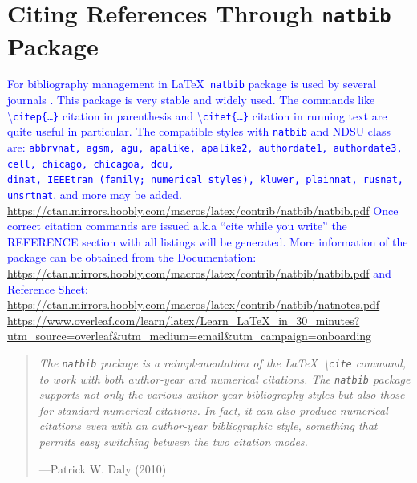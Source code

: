 \documentclass[phd]{ndsu-thesis-2022}
\newcommand\italk[1]{\textcolor{blue}{#1}}  %
\newcommand\cmd[1]{\textbackslash\texttt{#1}}  %
\begin{document}

\section{Citing References Through \texttt{natbib} Package}
\italk{For bibliography management in \LaTeX\ \texttt{natbib} package is used by several journals \citep{daly2010natural}. This package is very stable and widely used. The commands like \cmd{citep\{\ldots\}} citation in parenthesis and \cmd{citet\{\ldots\}} citation in running text are quite useful in particular. The compatible styles with \texttt{natbib} and NDSU class are:  \texttt{abbrvnat, agsm, agu, apalike, apalike2, authordate1, authordate3, cell, chicago, chicagoa, dcu,} \\\texttt{dinat, IEEEtran (family;  numerical styles), kluwer, plainnat, rusnat, \\unsrtnat}, and more may be added. \url{https://ctan.mirrors.hoobly.com/macros/latex/contrib/natbib/natbib.pdf} Once correct citation commands are issued a.k.a ``cite while you write'' the REFERENCE section with all listings will be generated. More information of the package can be obtained from the Documentation: \textcolor{magenta}{\url{https://ctan.mirrors.hoobly.com/macros/latex/contrib/natbib/natbib.pdf}} and Reference Sheet: \!\!\textcolor{magenta}{\url{https://ctan.mirrors.hoobly.com/macros/latex/contrib/natbib/natnotes.pdf}}
\textcolor{magenta}{\url{https://www.overleaf.com/learn/latex/Learn_LaTeX_in_30_minutes?utm_source=overleaf&utm_medium=email&utm_campaign=onboarding}}}



\begin{quote}
\singlespacing
\raggedleft
\textit{The \texttt{natbib} package is a reimplementation of the \LaTeX\ \cmd{cite} command, to work with both author-year and numerical citations. The \texttt{natbib} package supports not only the various author-year bibliography styles but also those for standard numerical citations. In fact, it can also produce numerical citations even with an author-year bibliographic style, something that permits easy switching between the two citation modes.} 

\hfill---Patrick W. Daly (2010)
\end{quote}
\end{document}
